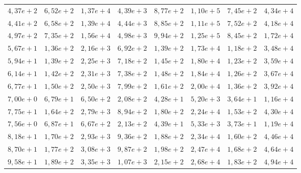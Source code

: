\documentclass [11pt]{articleSBPO}
\begin{document}
\begin{table}
\begin{tabular}{|m{1.3cm}|m{1.3cm}|m{1.3cm}|m{1.3cm}|m{1.3cm}|m{1.3cm}|m{1.3cm}||m{1.5cm}|}
		 $ 4,37e+2 $ & $ 6,52e+2 $ & $ 1,37e+4 $ & $ 4,39e+3 $ & $ 8,77e+2 $ & $ 1,10e+5 $ & $ 7,45e+2 $ & $ 4,34e+4 $ \\
		 $ 4,41e+2 $ & $ 6,58e+2 $ & $ 1,39e+4 $ & $ 4,44e+3 $ & $ 8,85e+2 $ & $ 1,11e+5 $ & $ 7,52e+2 $ & $ 4,18e+4 $ \\
		 $ 4,97e+2 $ & $ 7,35e+2 $ & $ 1,56e+4 $ & $ 4,98e+3 $ & $ 9,94e+2 $ & $ 1,25e+5 $ & $ 8,45e+2 $ & $ 1,72e+4 $ \\
		 $ 5,67e+1 $ & $ 1,36e+2 $ & $ 2,16e+3 $ & $ 6,92e+2 $ & $ 1,39e+2 $ & $ 1,73e+4 $ & $ 1,18e+2 $ & $ 3,48e+4 $ \\
		 $ 5,94e+1 $ & $ 1,39e+2 $ & $ 2,25e+3 $ & $ 7,18e+2 $ & $ 1,45e+2 $ & $ 1,80e+4 $ & $ 1,23e+2 $ & $ 3,59e+4 $ \\
		 $ 6,14e+1 $ & $ 1,42e+2 $ & $ 2,31e+3 $ & $ 7,38e+2 $ & $ 1,48e+2 $ & $ 1,84e+4 $ & $ 1,26e+2 $ & $ 3,67e+4 $ \\
		 $ 6,77e+1 $ & $ 1,50e+2 $ & $ 2,50e+3 $ & $ 7,99e+2 $ & $ 1,61e+2 $ & $ 2,00e+4 $ & $ 1,36e+2 $ & $ 3,92e+4 $ \\
		 $ 7,00e+0 $ & $ 6,79e+1 $ & $ 6,50e+2 $ & $ 2,08e+2 $ & $ 4,28e+1 $ & $ 5,20e+3 $ & $ 3,64e+1 $ & $ 1,16e+4 $ \\
		 $ 7,75e+1 $ & $ 1,64e+2 $ & $ 2,79e+3 $ & $ 8,94e+2 $ & $ 1,80e+2 $ & $ 2,24e+4 $ & $ 1,53e+2 $ & $ 4,30e+4 $ \\
		 $ 7,56e+0 $ & $ 6,87e+1 $ & $ 6,67e+2 $ & $ 2,13e+2 $ & $ 4,39e+1 $ & $ 5,33e+3 $ & $ 3,73e+1 $ & $ 1,19e+4 $ \\
		 $ 8,18e+1 $ & $ 1,70e+2 $ & $ 2,93e+3 $ & $ 9,36e+2 $ & $ 1,88e+2 $ & $ 2,34e+4 $ & $ 1,60e+2 $ & $ 4,46e+4 $ \\
		 $ 8,70e+1 $ & $ 1,77e+2 $ & $ 3,08e+3 $ & $ 9,87e+2 $ & $ 1,98e+2 $ & $ 2,47e+4 $ & $ 1,68e+2 $ & $ 4,64e+4 $ \\
		 $ 9,58e+1 $ & $ 1,89e+2 $ & $ 3,35e+3 $ & $ 1,07e+3 $ & $ 2,15e+2 $ & $ 2,68e+4 $ & $ 1,83e+2 $ & $ 4,94e+4 $ \\
		\hline
	\end{tabular}
	\label{tbl:solucoes}
\end{table}
\end{document}

